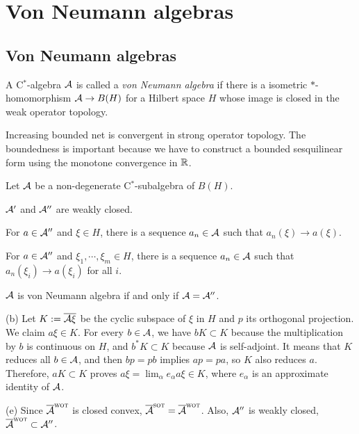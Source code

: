 \documentclass{../note}
\newcommand{\wot}{{\text{\sc wot}}}
\newcommand{\sot}{{\text{\sc sot}}}
\begin{document}
\chapter{Von Neumann algebras}
\section{Von Neumann algebras}

\begin{prb}
A C$^*$-algebra $\mathcal{A}$ is called a \emph{von Neumann algebra} if there is a isometric $*$-homomorphism $\mathcal{A}\to B(H)$ for a Hilbert space $H$ whose image is closed in the weak operator topology.
\end{prb}

\begin{prb}
Increasing bounded net is convergent in strong operator topology.
The boundedness is important because we have to construct a bounded sesquilinear form using the monotone convergence in $\mathbb{R}$.
\end{prb}

\begin{prb}
Let $\mathcal{A}$ be a non-degenerate C$^*$-subalgebra of $B(H)$.
\begin{parts}
\item $\mathcal{A}'$ and $\mathcal{A}''$ are weakly closed.
\item For $a\in\mathcal{A}''$ and $\xi\in H$, there is a sequence $a_n\in\mathcal{A}$ such that $a_n(\xi)\to a(\xi)$.
\item For $a\in\mathcal{A}''$ and $\xi_1,\cdots,\xi_m\in H$, there is a sequence $a_n\in\mathcal{A}$ such that $a_n(\xi_i)\to a(\xi_i)$ for all $i$.
\item $\mathcal{A}$ is von Neumann algebra if and only if $\mathcal{A}=\mathcal{A}''$.
\end{parts}
\end{prb}
\begin{pf}
(b)
Let $K:=\overline{\mathcal{A}\xi}$ be the cyclic subspace of $\xi$ in $H$ and $p$ its orthogonal projection.
We claim $a\xi\in K$.
For every $b\in\mathcal{A}$, we have $bK\subset K$ because the multiplication by $b$ is continuous on $H$, and $b^*K\subset K$ because $\mathcal{A}$ is self-adjoint.
It means that $K$ reduces all $b\in\mathcal{A}$, and then $bp=pb$ implies $ap=pa$, so $K$ also reduces $a$.
Therefore, $aK\subset K$ proves $a\xi=\lim_\alpha e_\alpha a\xi\in K$, where $e_\alpha$ is an approximate identity of $\mathcal{A}$.

(e)
Since $\bar\cA^\wot$ is closed convex, $\bar\cA^\sot=\bar\cA^\wot$.
Also, $\mathcal{A}''$ is weakly closed, $\bar\cA^\wot\subset\cA''$.
\end{pf}
\end{document}
